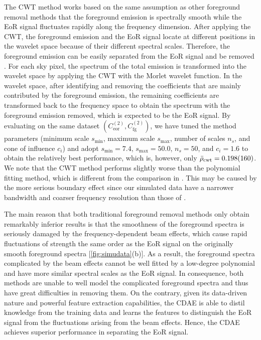 \documentclass[fleqn,usenatbib]{mnras}
\newcommand{\R}[1]{\mathrm{#1}}
\newcommand{\editone}[1]{{\leavevmode\color{cyan}#1}}
\begin{document}
\editone{%
The CWT method works based on the same assumption as other foreground
removal methods that the foreground emission is spectrally smooth while the
EoR signal fluctuates rapidly along the frequency dimension.
After applying the CWT, the foreground emission and the EoR signal locate
at different positions in the wavelet space because of their different
spectral scales.
Therefore, the foreground emission can be easily separated from the EoR
signal and be removed \citep{gu2013}.
For each sky pixel, the spectrum of the total emission is transformed into
the wavelet space by applying the CWT with the Morlet wavelet function.
In the wavelet space, after identifying and removing the coefficients that
are mainly contributed by the foreground emission, the remaining
coefficients are transformed back to the frequency space to obtain the
spectrum with the foreground emission removed, which is expected to be the
EoR signal.
By evaluating on the same dataset
$\left( C_{\R{eor}}^{(2)}, C_{\R{fg}}^{(2)} \right)$,
we have tuned the method parameters (minimum scale $s_{\R{min}}$, maximum
scale $s_{\R{max}}$, number of scales $n_s$, and cone of influence $c_i$)
and adopt $s_{\R{min}} = 7.4$, $s_{\R{max}} = 50.0$, $n_s = 50$, and
$c_i = 1.6$ to obtain the relatively best performance, which is, however,
only $\bar{\rho}_{\R{cwt}} = \num{0.198 +- 0.160}$.
We note that the CWT method performs slightly worse than the polynomial
fitting method, which is different from the comparison in \citet{gu2013}.
This may be caused by the more serious boundary effect since our simulated
data have a narrower bandwidth and coarser frequency resolution than those
of \citet{gu2013}.

The main reason that both traditional foreground removal methods only
obtain remarkably inferior results is that the smoothness of the foreground
spectra is seriously damaged by the frequency-dependent beam effects, which
cause rapid fluctuations of strength the same order as the EoR signal on
the originally smooth foreground spectra [\autoref{fig:simudata}(b)].
As a result, the foreground spectra complicated by the beam effects cannot
be well fitted by a low-degree polynomial and have more similar spectral
scales as the EoR signal.
In consequence, both methods are unable to well model the complicated
foreground spectra and thus have great difficulties in removing them.
On the contrary, given its data-driven nature and powerful feature
extraction capabilities, the CDAE is able to distil knowledge from the
training data and learns the features to distinguish the EoR signal from
the fluctuations arising from the beam effects.
Hence, the CDAE achieves superior performance in separating the EoR signal.
} %
\end{document}
